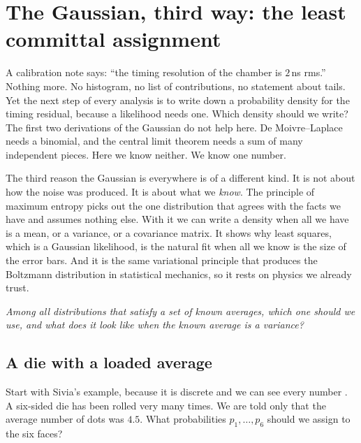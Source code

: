 \section{The Gaussian, third way: the least committal assignment}
\label{2b:sec:maxent}

A calibration note says: ``the timing resolution of the chamber is $2$\,ns rms.'' Nothing more. No histogram, no list of contributions, no statement about tails. Yet the next step of every analysis is to write down a probability density for the timing residual, because a likelihood needs one. Which density should we write? The first two derivations of the Gaussian do not help here. De Moivre--Laplace needs a binomial, and the central limit theorem needs a sum of many independent pieces. Here we know neither. We know one number.

The third reason the Gaussian is everywhere is of a different kind. It is not about how the noise was produced. It is about what we \emph{know}. The principle of maximum entropy picks out the one distribution that agrees with the facts we have and assumes nothing else. With it we can write a density when all we have is a mean, or a variance, or a covariance matrix. It shows why least squares, which is a Gaussian likelihood, is the natural fit when all we know is the size of the error bars. And it is the same variational principle that produces the Boltzmann distribution in statistical mechanics, so it rests on physics we already trust.

\emph{Among all distributions that satisfy a set of known averages, which one should we use, and what does it look like when the known average is a variance?}

\subsection{A die with a loaded average}
\label{2b:sec:maxent-die}

Start with Sivia's example, because it is discrete and we can see every number . A six-sided die has been rolled very many times. We are told only that the average number of dots was $4.5$. What probabilities $p_1,\dots,p_6$ should we assign to the six faces?

